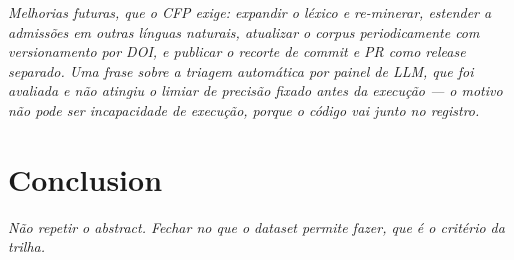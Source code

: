 \documentclass[10pt,conference]{IEEEtran}
\begin{document}
\textit{Melhorias futuras, que o CFP exige: expandir o léxico e re-minerar,
estender a admissões em outras línguas naturais, atualizar o corpus
periodicamente com versionamento por DOI, e publicar o recorte de commit e PR
como release separado. Uma frase sobre a triagem automática por painel de LLM,
que foi avaliada e não atingiu o limiar de precisão fixado antes da execução ---
o motivo não pode ser incapacidade de execução, porque o código vai junto no
registro.}

\section{Conclusion}
\label{sec:conclusion}

\textit{Não repetir o abstract. Fechar no que o dataset permite fazer, que é o
critério da trilha.}



\end{document}
